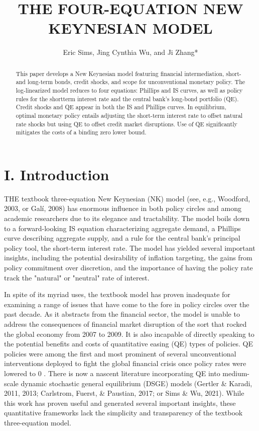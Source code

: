 \documentclass[10pt]{article}
\title{THE FOUR-EQUATION NEW KEYNESIAN MODEL }
\author{Eric Sims, Jing Cynthia Wu, and Ji Zhang*}
\date{}
\begin{document}
\maketitle


\begin{abstract}
This paper develops a New Keynesian model featuring financial intermediation, short- and long-term bonds, credit shocks, and scope for unconventional monetary policy. The log-linearized model reduces to four equations: Phillips and IS curves, as well as policy rules for the shortterm interest rate and the central bank's long-bond portfolio (QE). Credit shocks and QE appear in both the IS and Phillips curves. In equilibrium, optimal monetary policy entails adjusting the short-term interest rate to offset natural rate shocks but using QE to offset credit market disruptions. Use of QE significantly mitigates the costs of a binding zero lower bound.
\end{abstract}

\section*{I. Introduction}
THE textbook three-equation New Keynesian (NK) model (see, e.g., Woodford, 2003, or Galí, 2008) has enormous influence in both policy circles and among academic researchers due to its elegance and tractability. The model boils down to a forward-looking IS equation characterizing aggregate demand, a Phillips curve describing aggregate supply, and a rule for the central bank's principal policy tool, the short-term interest rate. The model has yielded several important insights, including the potential desirability of inflation targeting, the gains from policy commitment over discretion, and the importance of having the policy rate track the "natural" or "neutral" rate of interest.

In spite of its myriad uses, the textbook model has proven inadequate for examining a range of issues that have come to the fore in policy circles over the past decade. As it abstracts from the financial sector, the model is unable to address the consequences of financial market disruption of the sort that rocked the global economy from 2007 to 2009. It is also incapable of directly speaking to the potential benefits and costs of quantitative easing (QE) types of policies. QE policies were among the first and most prominent of several unconventional interventions deployed to fight the global financial crisis once policy rates were lowered to 0 . There is now a nascent literature incorporating QE into medium-scale dynamic stochastic general equilibrium (DSGE) models (Gertler \& Karadi, 2011, 2013; Carlstrom, Fuerst, \& Paustian, 2017; or Sims \& Wu, 2021). While this work has proven useful and generated several important insights, these quantitative frameworks lack the simplicity and transparency of the textbook three-equation model.
\end{document}
